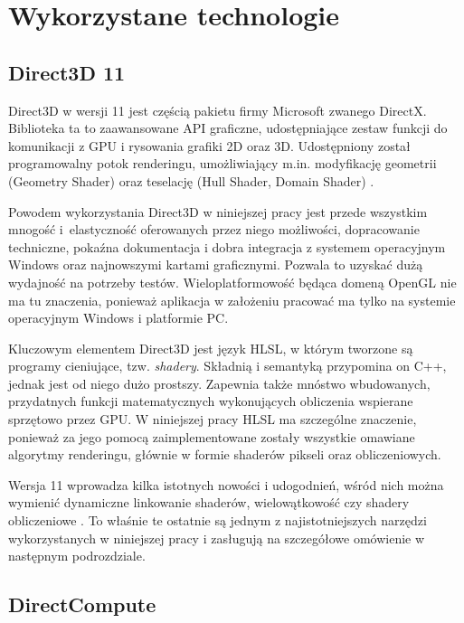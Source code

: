 \chapter{Wykorzystane technologie}
\label{t:technologie}
	
	\section{Direct3D 11}
	\label{t:technologie:directx}
	
	Direct3D w wersji 11 jest częścią pakietu firmy Microsoft zwanego DirectX. Biblioteka ta to zaawansowane API graficzne, udostępniające zestaw funkcji do komunikacji z GPU i rysowania grafiki 2D oraz 3D. Udostępniony został programowalny potok renderingu, umożliwiający m.in. modyfikację geometrii (Geometry Shader) oraz teselację (Hull Shader, Domain Shader) \cite{directx0}.
	
	Powodem wykorzystania Direct3D w niniejszej pracy jest przede wszystkim mnogość i~elastyczność oferowanych przez niego możliwości, dopracowanie techniczne, pokaźna dokumentacja i dobra integracja z systemem operacyjnym Windows oraz najnowszymi kartami graficznymi. Pozwala to uzyskać dużą wydajność na potrzeby testów. Wieloplatformowość będąca domeną OpenGL nie ma tu znaczenia, ponieważ aplikacja w założeniu pracować ma tylko na systemie operacyjnym Windows i platformie PC.
	
	Kluczowym elementem Direct3D jest język HLSL, w którym tworzone są programy cieniujące, tzw. \emph{shadery}. Składnią i semantyką przypomina on C++, jednak jest od niego dużo prostszy. Zapewnia także mnóstwo wbudowanych, przydatnych funkcji matematycznych wykonujących obliczenia wspierane sprzętowo przez GPU. W niniejszej pracy HLSL ma szczególne znaczenie, ponieważ za jego pomocą zaimplementowane zostały wszystkie omawiane algorytmy renderingu, głównie w formie shaderów pikseli oraz obliczeniowych.
	
	Wersja 11 wprowadza kilka istotnych nowości i udogodnień, wśród nich można wymienić dynamiczne linkowanie shaderów, wielowątkowość czy shadery obliczeniowe \cite{directx1}. To właśnie te ostatnie są jednym z najistotniejszych narzędzi wykorzystanych w niniejszej pracy i zasługują na szczegółowe omówienie w następnym podrozdziale.
	
	\section{DirectCompute}
	\label{t:technologie:directcompute}
	
